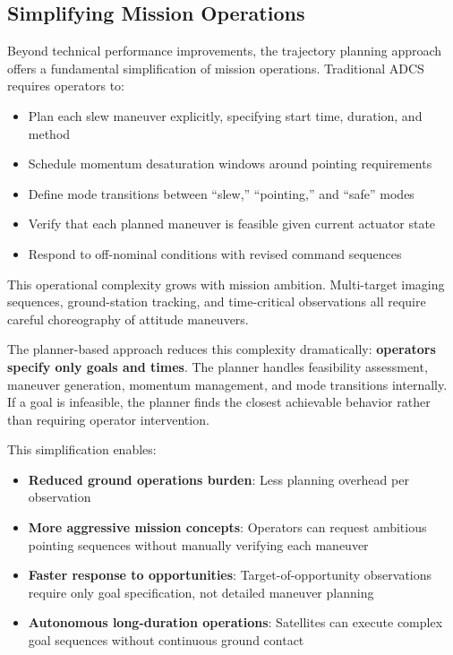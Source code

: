 \documentclass[conference]{IEEEtran}
\begin{document}
\subsection{Simplifying Mission Operations}\label{subsec:conops_simplification}

Beyond technical performance improvements, the trajectory planning approach offers a fundamental simplification of mission operations. Traditional ADCS requires operators to:
\begin{itemize}
    \item Plan each slew maneuver explicitly, specifying start time, duration, and method
    \item Schedule momentum desaturation windows around pointing requirements
    \item Define mode transitions between ``slew,'' ``pointing,'' and ``safe'' modes
    \item Verify that each planned maneuver is feasible given current actuator state
    \item Respond to off-nominal conditions with revised command sequences
\end{itemize}

This operational complexity grows with mission ambition. Multi-target imaging sequences, ground-station tracking, and time-critical observations all require careful choreography of attitude maneuvers.

The planner-based approach reduces this complexity dramatically: \textbf{operators specify only goals and times}. The planner handles feasibility assessment, maneuver generation, momentum management, and mode transitions internally. If a goal is infeasible, the planner finds the closest achievable behavior rather than requiring operator intervention.

This simplification enables:
\begin{itemize}
    \item \textbf{Reduced ground operations burden}: Less planning overhead per observation
    \item \textbf{More aggressive mission concepts}: Operators can request ambitious pointing sequences without manually verifying each maneuver
    \item \textbf{Faster response to opportunities}: Target-of-opportunity observations require only goal specification, not detailed maneuver planning
    \item \textbf{Autonomous long-duration operations}: Satellites can execute complex goal sequences without continuous ground contact
\end{itemize}
\end{document}
